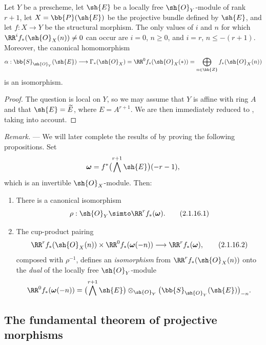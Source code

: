\begin{proposition}[2.1.15]
\label{III.2.1.15}
Let $Y$ be a prescheme, let $\sh{E}$ be a locally free $\sh{O}_Y$-module of rank $r+1$, let $X=\bb{P}(\sh{E})$ be the projective bundle defined by $\sh{E}$, and let $f:X\to Y$ be the structural morphism.
The only values of $i$ and $n$ for which $\RR^if_*(\sh{O}_X(n))\neq0$ can occur are $i=0$, $n\geq0$, and $i=r$, $n\leq-(r+1)$.
Moreover, the canonical homomorphism 
\[
  \alpha:\bb{S}_{\sh{O}_Y}(\sh{E})
  \longrightarrow \Gamma_*(\sh{O}_X)
  =\RR^0f_*(\sh{O}_X(*))
  =\bigoplus_{n\in\bb{Z}}f_*(\sh{O}_X(n))
\]
is an isomorphism.
\end{proposition}

\begin{proof}
The question is local on $Y$, so we may assume that $Y$ is affine with ring $A$ and that $\sh{E}=\widetilde{E}$, where $E=A^{r+1}$.
We are then immediately reduced to , taking  into account.
\end{proof}

\begin{env}[2.1.16]
\label{III.2.1.16}
\emph{Remark.} ---
We will later complete the results of  by proving the following propositions.
Set
\[
  \boldsymbol{\omega}=f^*\bigl(\bigwedge^{r+1}\sh{E}\bigr)(-r-1),
\]
which is an invertible $\sh{O}_X$-module.
Then:
\begin{enumerate}
  \item[{\rm(i)}] There is a canonical isomorphism
  \[
  \label{III.2.1.16.1}
    \rho:\sh{O}_Y \simto \RR^rf_*(\boldsymbol{\omega}).
    \tag{2.1.16.1}
  \]
  \item[{\rm(ii)}] The cup-product pairing 
  \[
  \label{III.2.1.16.2}
    \RR^rf_*(\sh{O}_X(n))
    \times \RR^0f_*(\boldsymbol{\omega}(-n))
    \longrightarrow \RR^rf_*(\boldsymbol{\omega}),
    \tag{2.1.16.2}
  \]
  composed with $\rho^{-1}$, defines an \emph{isomorphism} from $\RR^rf_*(\sh{O}_X(n))$ onto the \emph{dual} of the locally free $\sh{O}_Y$-module
  \[
    \RR^0f_*(\boldsymbol{\omega}(-n))
    =\bigl(\bigwedge^{r+1}\sh{E}\bigr)
      \otimes_{\sh{O}_Y}
      \bigl(\bb{S}_{\sh{O}_Y}(\sh{E})\bigr)_{-n}.
  \]
\end{enumerate}
\end{env}

\subsection{The fundamental theorem of projective morphisms}
\label{subsection:III.2.2}


